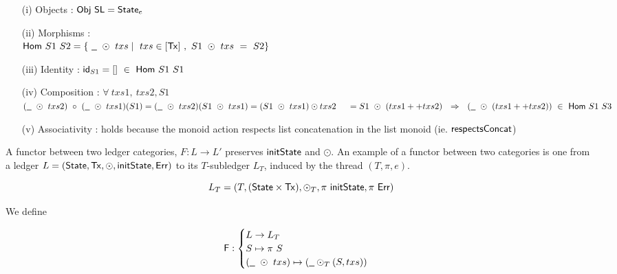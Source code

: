\begin{itemize}
  \item[(i)] Objects : $\mathsf{Obj}~\mathsf{SL} = \mathsf{State}_e$ \newline

  \item[(ii)] Morphisms : \\
  $\fun{Hom}~S1~S2 = \{ ~\wcard~\odot~txs \mid ~txs \in [\Tx]~,~S1~ \odot~txs~=~S2 \}$ \newline

  \item[(iii)] Identity : $\mathsf{id}_{S1} = [] ~\in~\mathsf{Hom}~S1~S1 $ \newline

  \item[(iv)] Composition : $\forall~txs1,~txs2, S1$ \\
  $(\wcard~\odot~txs2) ~\circ~(\wcard~\odot~txs1) (S1) = (\wcard~\odot~txs2) (S1~\odot~txs1) = (S1~\odot~txs1) \odot txs2  \\
  ~~~~ =  S1~\odot~(txs1 ++ txs2)~~\Rightarrow ~~(\wcard~\odot~(txs1 ++ txs2))~\in ~\fun{Hom}~S1~S3$

  \item[(v)] Associativity : holds because the monoid action respects list concatenation
  in the list monoid (ie. $\mathsf{respectsConcat}$)\\

\end{itemize}

A functor between two ledger categories, $F : L \to L'$ preserves $\mathsf{initState}$ and
$\odot$. An example of a functor between two categories is one from a ledger
$L = (\mathsf{State}, \mathsf{Tx}, \odot, \mathsf{initState}, \mathsf{Err})$ to its $T$-subledger $L_T$, induced by
the thread $(T, \pi, e)$.

\[ L_T = (T, (\mathsf{State} \times \mathsf{Tx}), \odot_T, \pi~\mathsf{initState}, \pi~\mathsf{Err}) \]

We define

\[ \mathsf{F} : \begin{cases}
  L \to L_T \\
  S \mapsto \pi~S \\
  (\wcard~\odot~txs) \mapsto (\wcard \odot_T (S, txs))
\end{cases}  \]

